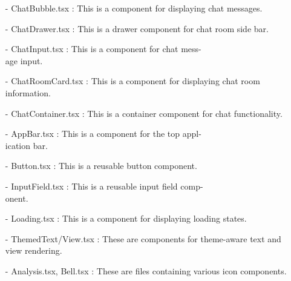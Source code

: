 \documentclass[conference]{IEEEtran}
\begin{document}
\begin{enumerate}
        \item[-] ChatBubble.tsx : This is a component for displaying chat messages. \\
        \item[-] ChatDrawer.tsx : This is a drawer component for chat room side bar. \\
        \item[-] ChatInput.tsx : This is a component for chat mess-\\age input.\\
        \item[-] ChatRoomCard.tsx : This is a component for displaying chat room information. \\
        \item[-] ChatContainer.tsx : This is a container component for chat functionality.\\
        
        \item[-] AppBar.tsx : This is a component for the top appl-\\ication bar.\\
        \item[-] Button.tsx : This is a reusable button component.\\
        \item[-] InputField.tsx : This is a reusable input field comp-\\onent. \\
        \item[-] Loading.tsx : This is a component for displaying loading states.\\
        \item[-] ThemedText/View.tsx : These are components for theme-aware text and view rendering.\\
    
        \item[-] Analysis.tsx, Bell.tsx : These are files containing various icon components.\\


\end{enumerate}
\end{document}
